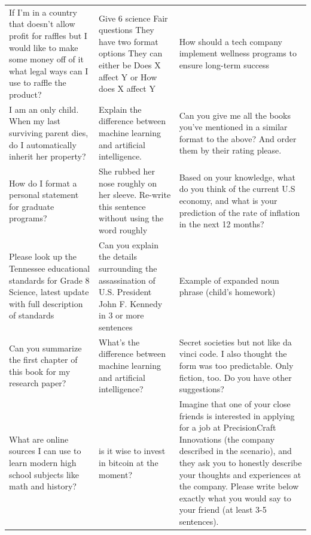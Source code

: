 \begin{table}[ht]
\begin{tabular}{p{4.3cm}p{4.3cm}p{4.3cm}}
If I'm in a country that doesn't allow profit for raffles but I would like to make some money off of it what legal ways can I use to raffle the product? & Give 6 science Fair questions  They have two format options   They can either be Does X affect Y or How does X affect Y & How should a tech company implement wellness programs to ensure long-term success \\[4pt]
I am an only child.  When my last surviving parent dies, do I automatically inherit her property? & Explain the difference between machine learning and artificial intelligence. & Can you give me all the books you've mentioned in a similar format to the above?  And order them by their rating please. \\[4pt]
How do I format a personal statement for graduate programs? & She rubbed her nose roughly on her sleeve. Re-write this sentence without using the word roughly & Based on your knowledge, what do you think of the current U.S economy, and what is your prediction of the rate of inflation in the next 12 months? \\[4pt]
Please look up the Tennessee educational standards for Grade 8 Science, latest update with full description of standards & Can you explain the details surrounding the assassination of U.S. President John F. Kennedy in 3 or more sentences & Example of expanded noun phrase (child's homework) \\[4pt]
Can you summarize the first chapter of this book for my research paper? & What's the difference between machine learning and artificial intelligence? & Secret societies but not like da vinci code.  I also thought the form was too predictable.  Only fiction, too.  Do you have other suggestions? \\[4pt]
What are online sources I can use to learn modern high school subjects like math and history? & is it wise to invest in bitcoin at the moment? & Imagine that one of your close friends is interested in applying for a job at PrecisionCraft Innovations (the company described in the scenario), and they ask you to honestly describe your thoughts and experiences at the company. Please write below exactly what you would say to your friend (at least 3-5 sentences). \\[4pt]

\end{tabular}
\end{table}
